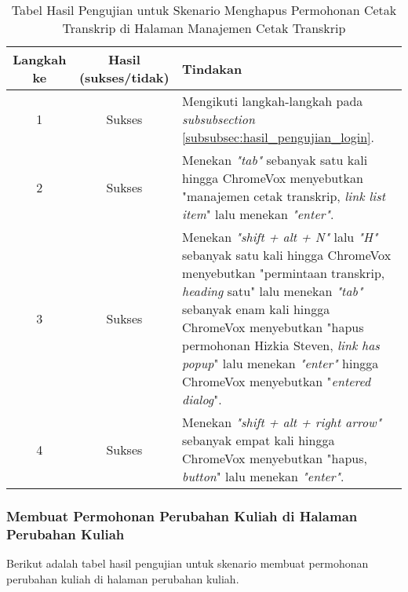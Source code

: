 \begin{table}[H]
    \centering 
    \caption{Tabel Hasil Pengujian untuk Skenario Menghapus Permohonan Cetak Transkrip di Halaman Manajemen Cetak Transkrip}
    \label{tab:hasil_pengujian_menghapus_permohonan_cetak_transkrip_di_halaman_manajemen_cetak_transkrip}
    \begin{tabular}{|c|c|p{10cm}|}
        \toprule
        Langkah ke & Hasil (sukses/tidak) & Tindakan \\

        \midrule
        1 & Sukses & Mengikuti langkah-langkah pada \textit{subsubsection} \ref{subsubsec:hasil_pengujian_login}. \\
        2 & Sukses & Menekan \textit{"tab"} sebanyak satu kali hingga ChromeVox menyebutkan "manajemen cetak transkrip, \textit{link list item}" lalu menekan \textit{"enter"}. \\
        3 & Sukses & Menekan \textit{"shift + alt + N"} lalu \textit{"H"} sebanyak satu kali hingga ChromeVox menyebutkan "permintaan transkrip, \textit{heading} satu" lalu menekan \textit{"tab"} sebanyak enam kali hingga ChromeVox menyebutkan "hapus permohonan Hizkia Steven, \textit{link has popup}" lalu menekan \textit{"enter"} hingga ChromeVox menyebutkan "\textit{entered dialog}". \\
        4 & Sukses & Menekan \textit{"shift + alt + right arrow"} sebanyak empat kali hingga ChromeVox menyebutkan "hapus, \textit{button}" lalu menekan \textit{"enter"}. \\ 

        \bottomrule

    \end{tabular}
\end{table}

\subsubsection{Membuat Permohonan Perubahan Kuliah di Halaman Perubahan Kuliah}
\label{subsubsec:hasil_pengujian_membuat_permohonan_perubahan_kuliah_di_halaman_perubahan_kuliah}
Berikut adalah tabel hasil pengujian untuk skenario membuat permohonan perubahan kuliah di halaman perubahan kuliah.

